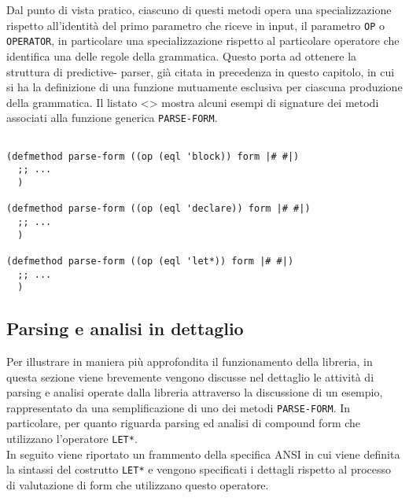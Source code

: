Dal punto di vista pratico, ciascuno di questi metodi opera una
specializzazione rispetto all’identità del primo parametro che riceve in
input, il parametro \texttt{OP} o \texttt{OPERATOR}, in particolare una
specializzazione rispetto al particolare operatore che identifica una delle
regole della grammatica. Questo porta ad ottenere la struttura di predictive-
parser, già citata in precedenza in questo capitolo, in cui si ha la
definizione di una funzione mutuamente esclusiva per ciascuna produzione della
grammatica. Il listato <> mostra alcuni esempi di signature dei metodi
associati alla funzione generica \texttt{PARSE-FORM}.



\begin{lstlisting}[caption=Esempi di specializzazione operata dai metodi
\texttt{PARSE-FORM}]

(defmethod parse-form ((op (eql 'block)) form |# #|)
  ;; ...
  )

(defmethod parse-form ((op (eql 'declare)) form |# #|)
  ;; ...
  )

(defmethod parse-form ((op (eql 'let*)) form |# #|)
  ;; ...
  )

\end{lstlisting}

\subsection{Parsing e analisi in dettaglio}

Per illustrare in maniera più approfondita il funzionamento della libreria, in
questa sezione viene brevemente vengono discusse nel dettaglio le attività di
parsing e analisi operate dalla libreria attraverso la discussione di un
esempio, rappresentato da una semplificazione di uno dei metodi \texttt
{PARSE-FORM}. In particolare, per quanto riguarda parsing ed analisi di
compound form che utilizzano l’operatore \texttt{LET*}.\\

In seguito viene riportato un frammento della specifica ANSI in cui viene
definita la sintassi del costrutto \texttt{LET*} e vengono specificati i
dettagli rispetto al processo di valutazione di form che utilizzano questo
operatore.

